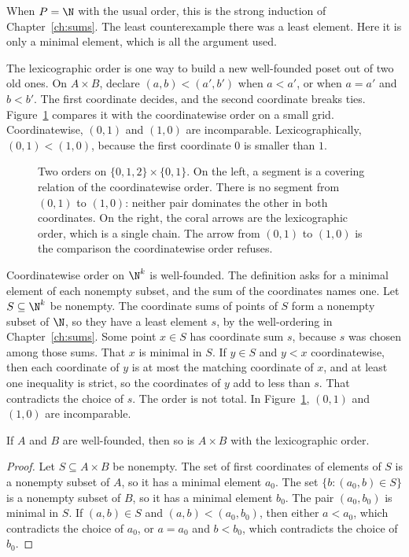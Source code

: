 When $P=\N$ with the usual order, this is the strong induction of Chapter~\ref{ch:sums}. The least counterexample there was a least element. Here it is only a minimal element, which is all the argument used.

The lexicographic order is one way to build a new well-founded poset out of two old ones. On $A\times B$, declare $(a,b)<(a',b')$ when $a<a'$, or when $a=a'$ and $b<b'$. The first coordinate decides, and the second coordinate breaks ties. Figure~\ref{orders:fig:lex} compares it with the coordinatewise order on a small grid. Coordinatewise, $(0,1)$ and $(1,0)$ are incomparable. Lexicographically, $(0,1)<(1,0)$, because the first coordinate $0$ is smaller than $1$.

\begin{figure}[ht]
\centering
{}
\caption{Two orders on $\{0,1,2\}\times\{0,1\}$. On the left, a segment is a covering relation of the coordinatewise order. There is no segment from $(0,1)$ to $(1,0)$: neither pair dominates the other in both coordinates. On the right, the coral arrows are the lexicographic order, which is a single chain. The arrow from $(0,1)$ to $(1,0)$ is the comparison the coordinatewise order refuses.}
\label{orders:fig:lex}
\end{figure}

Coordinatewise order on $\N^k$ is well-founded. The definition asks for a minimal element of each nonempty subset, and the sum of the coordinates names one. Let $S\subseteq\N^k$ be nonempty. The coordinate sums of points of $S$ form a nonempty subset of $\N$, so they have a least element $s$, by the well-ordering in Chapter~\ref{ch:sums}. Some point $x\in S$ has coordinate sum $s$, because $s$ was chosen among those sums. That $x$ is minimal in $S$. If $y\in S$ and $y<x$ coordinatewise, then each coordinate of $y$ is at most the matching coordinate of $x$, and at least one inequality is strict, so the coordinates of $y$ add to less than $s$. That contradicts the choice of $s$. The order is not total. In Figure~\ref{orders:fig:lex}, $(0,1)$ and $(1,0)$ are incomparable.

\begin{proposition}\label{orders:prop:lex}
If $A$ and $B$ are well-founded, then so is $A\times B$ with the lexicographic order.
\end{proposition}
\begin{proof}
Let $S\subseteq A\times B$ be nonempty. The set of first coordinates of elements of $S$ is a nonempty subset of $A$, so it has a minimal element $a_0$. The set $\{b:(a_0,b)\in S\}$ is a nonempty subset of $B$, so it has a minimal element $b_0$. The pair $(a_0,b_0)$ is minimal in $S$. If $(a,b)\in S$ and $(a,b)<(a_0,b_0)$, then either $a<a_0$, which contradicts the choice of $a_0$, or $a=a_0$ and $b<b_0$, which contradicts the choice of $b_0$.
\end{proof}

